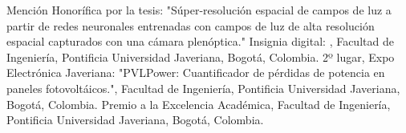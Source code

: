 %
%
%


\begin{awards}
                    {Mención Honorífica por la tesis: "Súper-resolución espacial de campos de luz a partir de redes neuronales entrenadas con campos de luz de alta resolución espacial capturados con una cámara plenóptica." Insignia digital: \href{https://wallet.xertify.co/certificates/E8381125A002}{\color{CadetBlue}{Certificado}}, Facultad de Ingeniería, Pontificia Universidad Javeriana, Bogotá, Colombia.}
                    {2º lugar, Expo Electrónica Javeriana: "PVLPower: Cuantificador de pérdidas de potencia en paneles fotovoltáicos.", Facultad de Ingeniería, Pontificia Universidad Javeriana, Bogotá, Colombia.}
                    {Premio a la Excelencia Académica, Facultad de Ingeniería, Pontificia Universidad Javeriana, Bogotá, Colombia.}
\end{awards}
